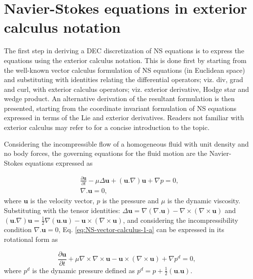 \documentclass[final,12pt,times]{elsarticle}
\begin{document}
\section{Navier-Stokes equations in exterior calculus notation}
\label{sec:smoothNS}

The first step in deriving a DEC discretization of NS equations is to express the equations using the exterior calculus notation. This is done first by starting from the well-known vector calculus formulation of NS equations (in Euclidean space) and substituting with identities relating the differential operators; viz. div, grad and curl, with exterior calculus operators; viz. exterior derivative, Hodge star and wedge product. An alternative derivation of the resultant formulation is then presented, starting from the coordinate invariant formulation of NS equations expressed in terms of the Lie and exterior derivatives. Readers not familiar with exterior calculus may refer to \cite{HiNaCh2015,perot2014differential} for a concise introduction to the topic.   
 
Considering the incompressible flow of a homogeneous fluid with unit density and no body forces, the governing equations for the fluid motion are the Navier-Stokes equations expressed as

\begin{subequations}
\label{eq:NS-vector-calculus-1}
\begin{align}
\label{eq:NS-vector-calculus-1-a}
&\frac{\partial \mathbf{u}}{\partial t} - \mu \Delta \mathbf{u} + (\mathbf{u}.\nabla) \mathbf{u} + \nabla p =0, \\
\label{eq:NS-vector-calculus-1-b}
&\nabla . \mathbf{u} = 0,
\end{align}
\end{subequations}
where $\mathbf{u}$ is the velocity vector, $p$ is the pressure and $\mu$ is the dynamic viscosity. Substituting with the tensor identities: $\Delta \mathbf{u} = \nabla (\nabla . \mathbf{u}) - \nabla \times (\nabla \times \mathbf{u})$ and $(\mathbf{u}.\nabla) \mathbf{u} = \frac{1}{2}\nabla( \mathbf{u}.\mathbf{u}) - \mathbf{u} \times (\nabla \times \mathbf{u})$, and considering the incompressibility condition $\nabla . \mathbf{u} = 0$, Eq. \eqref{eq:NS-vector-calculus-1-a} can be expressed in its rotational form as

\begin{equation}
\label{eq:NS-vector-calculus-2}
\frac{\partial \mathbf{u}}{\partial t} + \mu \nabla \times \nabla \times \mathbf{u} - \mathbf{u} \times (\nabla \times \mathbf{u}) + \nabla p^d =0,
\end{equation}
where $p^d$ is the dynamic pressure defined as $p^d = p + \frac{1}{2}( \mathbf{u}.\mathbf{u})$. 
\end{document}
